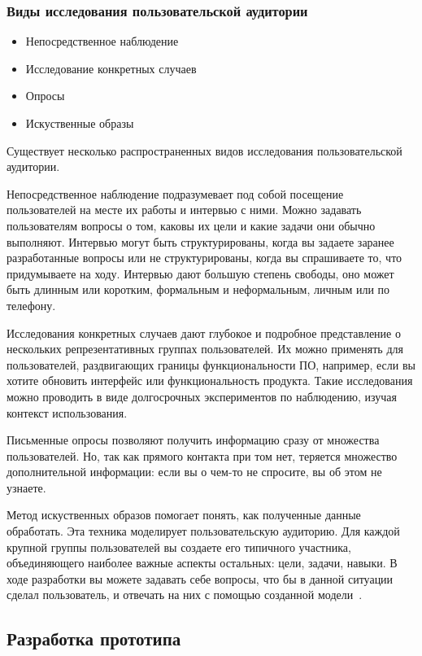 \documentclass{../industrial-development}
\begin{document}
\begin{frame} \frametitle{Виды исследования пользовательской аудитории}
  \begin{itemize}
   \item Непосредственное наблюдение
   \item Исследование конкретных случаев
   \item Опросы
   \item Искуственные образы
  \end{itemize}
\end{frame}

\lecturenotes

Существует несколько распространенных видов исследования пользовательской аудитории.

Непосредственное наблюдение подразумевает под собой посещение пользователей на месте их работы и интервью с ними. Можно задавать пользователям вопросы о том, каковы их цели и какие задачи они обычно выполняют. Интервью могут быть структурированы, когда вы задаете заранее разработанные вопросы или не структурированы, когда вы спрашиваете то, что придумываете на ходу. Интервью дают большую степень свободы, оно может быть длинным или коротким, формальным и неформальным, личным или по телефону.

Исследования конкретных случаев дают глубокое и подробное представление о нескольких репрезентативных группах пользователей. Их можно применять для пользователей, раздвигающих границы функциональности ПО, например, если вы хотите обновить интерфейс или функциональность продукта. Такие исследования можно проводить в виде долгосрочных экспериментов по наблюдению, изучая контекст использования.

Письменные опросы позволяют получить информацию сразу от множества пользователей. Но, так как прямого контакта при том нет, теряется множество дополнительной информации: если вы о чем-то не спросите, вы об этом не узнаете.

Метод искуственных образов помогает понять, как полученные данные обработать. Эта техника моделирует пользовательскую аудиторию. Для каждой крупной группы пользователей вы создаете его типичного участника, объединяющего наиболее важные аспекты остальных: цели, задачи, навыки. В ходе разработки вы можете задавать себе вопросы, что бы в данной ситуации сделал пользователь, и отвечать на них с помощью созданной модели~\cite[с.~27--28]{Tidvell}.

\subsection{Разработка прототипа}
\end{document}
